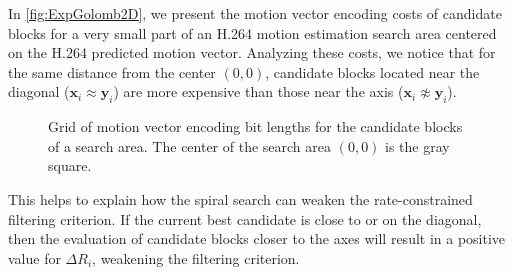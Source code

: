 \documentclass{article}
\newcommand{\vx}{\mathbf{x}}
\newcommand{\vy}{\mathbf{y}}
\begin{document}
In \autoref{fig:ExpGolomb2D}, we present the motion vector encoding costs of
candidate blocks for a very small part of an H.264 motion estimation search area
centered on the H.264 predicted motion vector. Analyzing these costs, we notice
that for the same distance from the center $(0,0)$, candidate blocks located
near the diagonal ($\vx_i \approx \vy_i$) are more expensive than those near the
axis ($\vx_i \not\approx \vy_i$).
\begin{figure}[htb] \centering
\vspace{-0.2em}
\caption{ Grid of motion vector encoding bit lengths for the candidate blocks
of a search area. The center of the search area $(0,0)$ is the gray square.}
\label{fig:ExpGolomb2D}
\vspace{-0.2em}
\end{figure}
This helps to explain how the spiral search can weaken the rate-constrained
filtering criterion. If the current best candidate is close to or on the
diagonal, then the evaluation of candidate blocks closer to the axes will result
in a positive value for $\Delta R_i$, weakening the filtering criterion.
\end{document}
